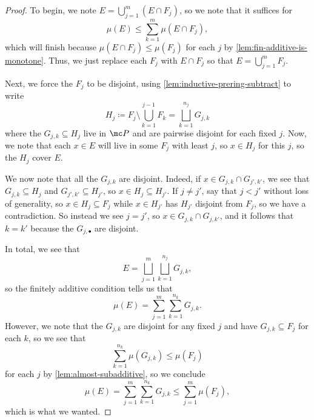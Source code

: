 \documentclass[../notes.tex]{subfiles}
\begin{document}
\begin{proof}
	To begin, we note $E=\bigcup_{j=1}^m(E\cap F_j)$, so we note that it suffices for
	\[\mu(E)\le\sum_{k=1}^m\mu(E\cap F_j),\]
	which will finish because $\mu(E\cap F_j)\le\mu(F_j)$ for each $j$ by \autoref{lem:fin-additive-is-monotone}. Thus, we just replace each $F_j$ with $E\cap F_j$ so that $E=\bigcup_{j=1}^mF_j$.
	
	Next, we force the $F_j$ to be disjoint, using \autoref{lem:inductive-prering-subtract} to write
	\[H_j\coloneqq F_j\setminus\bigcup_{k=1}^{j-1}F_k=\bigsqcup_{k=1}^{n_j}G_{j,k}\]
	where the $G_{j,k}\subseteq H_j$ live in $\mc P$ and are pairwise disjoint for each fixed $j$. Now, we note that each $x\in E$ will live in some $F_j$ with least $j$, so $x\in H_j$ for this $j$, so the $H_j$ cover $E$.

	We now note that all the $G_{j,k}$ are disjoint. Indeed, if $x\in G_{j,k}\cap G_{j',k'}$, we see that $G_{j,k}\subseteq H_j$ and $G_{j',k'}\subseteq H_{j'}$, so $x\in H_j\subseteq H_{j'}$. If $j\ne j'$, say that $j<j'$ without loss of generality, so $x\in H_j\subseteq F_j$ while $x\in H_{j'}$ has $H_{j'}$ disjoint from $F_j$, so we have a contradiction. So instead we see $j=j'$, so $x\in G_{j,k}\cap G_{j,k'}$, and it follows that $k=k'$ because the $G_{j,\bullet}$ are disjoint.

	In total, we see that
	\[E=\bigsqcup_{j=1}^m\bigsqcup_{k=1}^{n_j}G_{j,k},\]
	so the finitely additive condition tells us that
	\[\mu(E)=\sum_{j=1}^m\sum_{k=1}^{n_k}G_{j,k}.\]
	However, we note that the $G_{j,k}$ are disjoint for any fixed $j$ and have $G_{j,k}\subseteq F_j$ for each $k$, so we see that
	\[\sum_{k=1}^{n_k}\mu(G_{j,k})\le\mu(F_j)\]
	for each $j$ by \autoref{lem:almost-subadditive}, so we conclude
	\[\mu(E)=\sum_{j=1}^m\sum_{k=1}^{n_k}G_{j,k}\le\sum_{j=1}^m\mu(F_j),\]
	which is what we wanted.
\end{proof}
\end{document}
